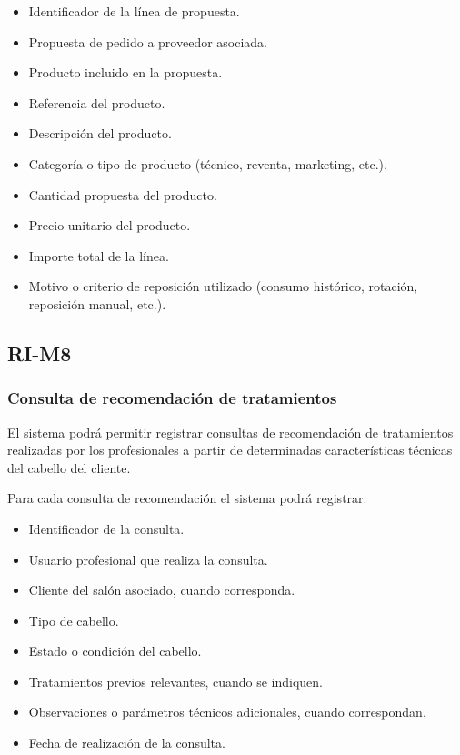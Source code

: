 \begin{itemize}

    \item Identificador de la línea de propuesta.
    \item Propuesta de pedido a proveedor asociada.
    \item Producto incluido en la propuesta.
    \item Referencia del producto.
    \item Descripción del producto.
    \item Categoría o tipo de producto (técnico, reventa, marketing, etc.).
    \item Cantidad propuesta del producto.
    \item Precio unitario del producto.
    \item Importe total de la línea.
    \item Motivo o criterio de reposición utilizado (consumo histórico, rotación, reposición manual, etc.).

\end{itemize}

\subsection{RI-M8}

\subsubsection*{Consulta de recomendación de tratamientos}

El sistema podrá permitir registrar consultas de recomendación de tratamientos realizadas por los profesionales a partir de determinadas características técnicas del cabello del cliente.

Para cada consulta de recomendación el sistema podrá registrar:

\begin{itemize}
    \item Identificador de la consulta.
    \item Usuario profesional que realiza la consulta.
    \item Cliente del salón asociado, cuando corresponda.
    \item Tipo de cabello.
    \item Estado o condición del cabello.
    \item Tratamientos previos relevantes, cuando se indiquen.
    \item Observaciones o parámetros técnicos adicionales, cuando correspondan.
    \item Fecha de realización de la consulta.
\end{itemize}

